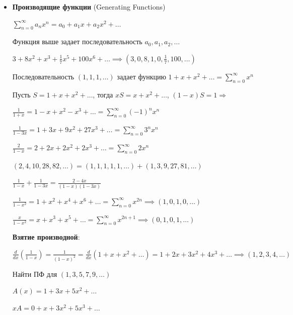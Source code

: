 \documentclass[12pt]{article}
\begin{document}
    \begin{itemize}
        \hypertarget{generatingfunction}{}

        \item \textbf{Производящие функции} (Generating Functions)

        $\sum_{n = 0}^\infty a_n x^n = a_0 + a_1 x + a_2 x^2 + \dots$

        Функция выше задает последовательность $a_0, a_1, a_2, \dots$

        \Ex $3 + 8x^2 + x^3 + \frac{1}{7}x^5 + 100x^6 + \dots \implies (3, 0, 8, 1, 0, \frac{1}{7}, 100, \dots)$

        \Ex Последовательность $(1, 1, 1, \dots)$ задает функцию $1 + x + x^2 + \dots = \sum_{n = 0}^\infty x^n$

        Пусть $S = 1 + x + x^2 + \dots$, тогда $xS = x + x^2 + \dots$, $(1 - x) S = 1 \Longrightarrow $


        \Ex

        $\frac{1}{1 + x} = 1 - x + x^2 - x^3 + \dots = \sum_{n = 0}^\infty (-1)^n x^n$

        $\frac{1}{1 - 3x} = 1 + 3x + 9x^2 + 27x^3 + \dots = \sum_{n = 0}^\infty 3^n x^n$

        $\frac{2}{1 - x} = 2 + 2x + 2x^2 + 2x^3 + \dots = \sum_{n = 0}^\infty 2 x^n$

        $(2, 4, 10, 28, 82, \dots) = (1, 1, 1, 1, 1, \dots) + (1, 3, 9, 27, 81, \dots)$

        $\frac{1}{1 - x} + \frac{1}{1 - 3x} = \frac{2 - 4x}{(1 - x)(1 - 3x)}$

        $\frac{1}{1 - x^2} = 1 + x^2 + x^4 + x^6 + \dots = \sum_{n = 0}^\infty x^{2n} \implies (1, 0, 1, 0, \dots)$

        $\frac{x}{1 - x^2} = x + x^3 + x^5 + \dots = \sum_{n = 0}^\infty x^{2n + 1} \implies (0, 1, 0, 1, \dots)$

        \textbf{Взятие производной}:

        $\frac{d}{dx} (\frac{1}{1 - x}) = \frac{1}{(1 - x)^2} = \frac{d}{dx} (1 + x + x^2 + \dots) = 1 + 2x + 3x^2 + 4x^3 + \dots \implies (1, 2, 3, 4, \dots)$

        \Ex Найти ПФ для $(1, 3, 5, 7, 9, \dots)$

        $A(x) = 1 + 3x + 5x^2 + \dots$

        $xA = 0 + x + 3x^2 + 5x^3 + \dots$


\end{itemize}
\end{document}
